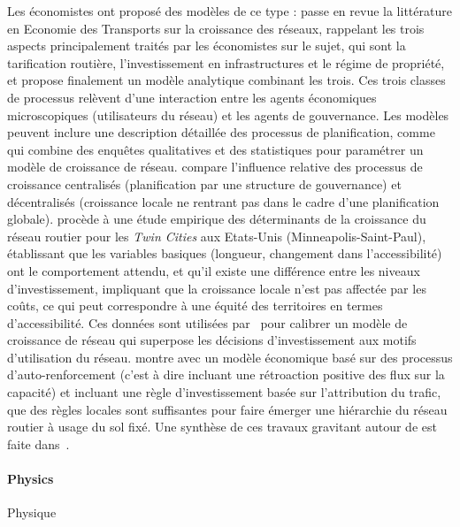 {Les économistes ont proposé des modèles de ce type : \cite{zhang2007economics} passe en revue la littérature en Economie des Transports sur la croissance des réseaux, rappelant les trois aspects principalement traités par les économistes sur le sujet, qui sont la tarification routière, l'investissement en infrastructures et le régime de propriété, et propose finalement un modèle analytique combinant les trois. Ces trois classes de processus relèvent d'une interaction entre les agents économiques microscopiques (utilisateurs du réseau) et les agents de gouvernance. Les modèles peuvent inclure une description détaillée des processus de planification, comme~\cite{levinson2012forecasting} qui combine des enquêtes qualitatives et des statistiques pour paramétrer un modèle de croissance de réseau. \cite{xie2009jurisdictional} compare l'influence relative des processus de croissance centralisés (planification par une structure de gouvernance) et décentralisés (croissance locale ne rentrant pas dans le cadre d'une planification globale). \cite{levinson2003induced} procède à une étude empirique des déterminants de la croissance du réseau routier pour les \emph{Twin Cities} aux Etats-Unis (Minneapolis-Saint-Paul), établissant que les variables basiques (longueur, changement dans l'accessibilité) ont le comportement attendu, et qu'il existe une différence entre les niveaux d'investissement, impliquant que la croissance locale n'est pas affectée par les coûts, ce qui peut correspondre à une équité des territoires en termes d'accessibilité. Ces données sont utilisées par~\cite{zhang2016model} pour calibrer un modèle de croissance de réseau qui superpose les décisions d'investissement aux motifs d'utilisation du réseau. \cite{yerra2005emergence} montre avec un modèle économique basé sur des processus d'auto-renforcement (c'est à dire incluant une rétroaction positive des flux sur la capacité) et incluant une règle d'investissement basée sur l'attribution du trafic, que des règles locales sont suffisantes pour faire émerger une hiérarchie du réseau routier à usage du sol fixé. Une synthèse de ces travaux gravitant autour de  est faite dans~\cite{xie2011evolving}.
}



\paragraph{Physics}{Physique}

